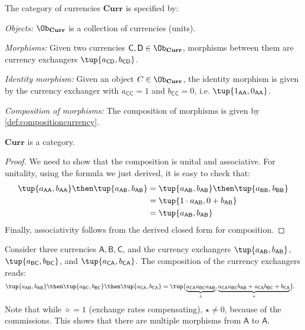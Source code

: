 \begin{definition}
    The category of currencies $\mathbf{Curr}$ is specified by:
    \begin{compactenum}
        \item \emph{Objects:} $\Ob_\mathbf{Curr}$ is a collection of currencies (units).
        \item \emph{Morphisms:} Given two currencies $\mathsf{C},\mathsf{D}\in \Ob_{\mathbf{Curr}}$, morphisms between them are currency exchangers $\tup{a_\mathsf{CD},b_\mathsf{CD}}$. 
        \item \emph{Identity morphism:} Given an object $C\in \Ob_\mathbf{Curr}$, the identity morphism is given by the currency exchanger with $a_\mathsf{CC}=1$ and $b_\mathsf{CC}=0$, i.e. $\tup{1_\mathsf{AA},0_\mathsf{AA}}$.
        \item \emph{Composition of morphisms:} The composition of morphisms is given by \cref{def:compositioncurrency}.
    \end{compactenum}
\end{definition}

\begin{lemma}
    $\mathbf{Curr}$ is a category.
\end{lemma}
\begin{proof}
    We need to show that the composition is unital and associative. For unitality, using the formula we just derived, it is easy to check that:
    \begin{equation}
        \begin{aligned}
        \tup{a_\mathsf{AA},b_\mathsf{AA}}\then \tup{a_\mathsf{AB},b_\mathsf{AB}}&= \tup{a_\mathsf{AB},b_\mathsf{AB}}\then \tup{a_\mathsf{BB},b_\mathsf{BB}}\\
        &=\tup{1\cdot a_\mathsf{AB},0+b_\mathsf{AB}}\\
        &=\tup{a_\mathsf{AB},b_\mathsf{AB}}
        \end{aligned}
    \end{equation}
    Finally, associativity follows from the derived closed form for composition.
\end{proof}

\begin{remark}
Consider three currencies $\mathsf{A,B,C}$, and the currency exchangers $\tup{a_\mathsf{AB},b_\mathsf{AB}}$,
$\tup{a_\mathsf{BC},b_\mathsf{BC}}$, and $\tup{a_\mathsf{CA},b_\mathsf{CA}}$. The composition of the currency exchangers reads:
\begin{equation}
    \begin{aligned}
     \tup{a_\mathsf{AB},b_\mathsf{AB}}\then \tup{a_\mathsf{BC},b_\mathsf{BC}} \then \tup{a_\mathsf{CA},b_\mathsf{CA}} &=\tup{\underbrace{a_\mathsf{CA} a_\mathsf{BC} a_\mathsf{AB}}_{\diamond},\underbrace{a_\mathsf{CA}a_\mathsf{BC}b_\mathsf{AB}+a_\mathsf{CA}b_\mathsf{BC}+b_\mathsf{CA}}_{\star}}.
    \end{aligned}
\end{equation}
Note that while $\diamond=1$ (exchange rates compensating), $\star\neq 0$, because of the commissions. This shows that there are multiple morphisms from $\mathsf{A}$ to $\mathsf{A}$.
\end{remark}

